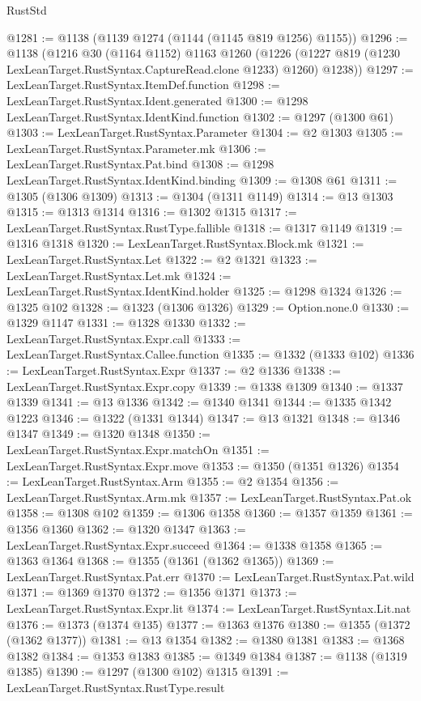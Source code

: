 \begin{lexlean}{RustStd}
\begin{coremodule}
@1281 := @1138 (@1139 @1274 (@1144 (@1145 @819 @1256) @1155))
@1296 := @1138
    (@1216
      @30
      (@1164 @1152)
      @1163
      @1260
      (@1226 (@1227 @819 (@1230 LexLeanTarget.RustSyntax.CaptureRead.clone @1233) @1260) @1238))
@1297 := LexLeanTarget.RustSyntax.ItemDef.function
@1298 := LexLeanTarget.RustSyntax.Ident.generated
@1300 := @1298 LexLeanTarget.RustSyntax.IdentKind.function
@1302 := @1297 (@1300 @61)
@1303 := LexLeanTarget.RustSyntax.Parameter
@1304 := @2 @1303
@1305 := LexLeanTarget.RustSyntax.Parameter.mk
@1306 := LexLeanTarget.RustSyntax.Pat.bind
@1308 := @1298 LexLeanTarget.RustSyntax.IdentKind.binding
@1309 := @1308 @61
@1311 := @1305 (@1306 @1309)
@1313 := @1304 (@1311 @1149)
@1314 := @13 @1303
@1315 := @1313 @1314
@1316 := @1302 @1315
@1317 := LexLeanTarget.RustSyntax.RustType.fallible
@1318 := @1317 @1149
@1319 := @1316 @1318
@1320 := LexLeanTarget.RustSyntax.Block.mk
@1321 := LexLeanTarget.RustSyntax.Let
@1322 := @2 @1321
@1323 := LexLeanTarget.RustSyntax.Let.mk
@1324 := LexLeanTarget.RustSyntax.IdentKind.holder
@1325 := @1298 @1324
@1326 := @1325 @102
@1328 := @1323 (@1306 @1326)
@1329 := Option.none.{0}
@1330 := @1329 @1147
@1331 := @1328 @1330
@1332 := LexLeanTarget.RustSyntax.Expr.call
@1333 := LexLeanTarget.RustSyntax.Callee.function
@1335 := @1332 (@1333 @102)
@1336 := LexLeanTarget.RustSyntax.Expr
@1337 := @2 @1336
@1338 := LexLeanTarget.RustSyntax.Expr.copy
@1339 := @1338 @1309
@1340 := @1337 @1339
@1341 := @13 @1336
@1342 := @1340 @1341
@1344 := @1335 @1342 @1223
@1346 := @1322 (@1331 @1344)
@1347 := @13 @1321
@1348 := @1346 @1347
@1349 := @1320 @1348
@1350 := LexLeanTarget.RustSyntax.Expr.matchOn
@1351 := LexLeanTarget.RustSyntax.Expr.move
@1353 := @1350 (@1351 @1326)
@1354 := LexLeanTarget.RustSyntax.Arm
@1355 := @2 @1354
@1356 := LexLeanTarget.RustSyntax.Arm.mk
@1357 := LexLeanTarget.RustSyntax.Pat.ok
@1358 := @1308 @102
@1359 := @1306 @1358
@1360 := @1357 @1359
@1361 := @1356 @1360
@1362 := @1320 @1347
@1363 := LexLeanTarget.RustSyntax.Expr.succeed
@1364 := @1338 @1358
@1365 := @1363 @1364
@1368 := @1355 (@1361 (@1362 @1365))
@1369 := LexLeanTarget.RustSyntax.Pat.err
@1370 := LexLeanTarget.RustSyntax.Pat.wild
@1371 := @1369 @1370
@1372 := @1356 @1371
@1373 := LexLeanTarget.RustSyntax.Expr.lit
@1374 := LexLeanTarget.RustSyntax.Lit.nat
@1376 := @1373 (@1374 @135)
@1377 := @1363 @1376
@1380 := @1355 (@1372 (@1362 @1377))
@1381 := @13 @1354
@1382 := @1380 @1381
@1383 := @1368 @1382
@1384 := @1353 @1383
@1385 := @1349 @1384
@1387 := @1138 (@1319 @1385)
@1390 := @1297 (@1300 @102) @1315
@1391 := LexLeanTarget.RustSyntax.RustType.result

\end{coremodule}
\end{lexlean}
